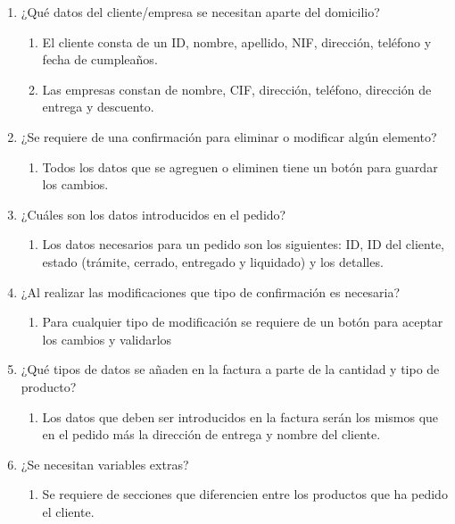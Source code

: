 \begin{enumerate}
    \item ¿Qué datos del cliente/empresa se necesitan aparte del domicilio?
    \begin{enumerate}
        \item El cliente consta de un ID, nombre, apellido, NIF, dirección, teléfono y fecha de cumpleaños.
        \item Las empresas constan de nombre, CIF, dirección, teléfono, dirección de entrega y descuento.
    \end{enumerate}

    \item ¿Se requiere de una confirmación para eliminar o modificar algún elemento?
    \begin{enumerate}
        \item  Todos los datos que se agreguen o eliminen tiene un botón para guardar los cambios.
    \end{enumerate}

    \item ¿Cuáles son los datos introducidos en el pedido?
    \begin{enumerate}
        \item Los datos necesarios para un pedido son los siguientes: ID, ID del cliente, estado (trámite, cerrado, entregado y liquidado) y los detalles.
    \end{enumerate}

    \item ¿Al realizar las modificaciones que tipo de confirmación es necesaria?
    \begin{enumerate}
        \item Para cualquier tipo de modificación se requiere de un botón para aceptar los cambios y validarlos
    \end{enumerate}

    \item ¿Qué tipos de datos se añaden en la factura a parte de la cantidad y tipo de producto?
    \begin{enumerate}
        \item Los datos que deben ser introducidos en la factura serán los mismos que en el pedido más la dirección de entrega y nombre del cliente.
    \end{enumerate}

    \item ¿Se necesitan variables extras?
    \begin{enumerate}
        \item Se requiere de secciones que diferencien entre los productos que ha pedido el cliente.
    \end{enumerate}


\end{enumerate}
